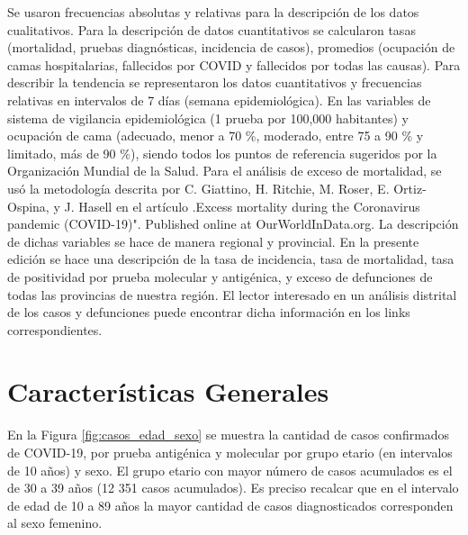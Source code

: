 \documentclass[12pt,a4paper,openany]{book}
\begin{document}
	Se usaron frecuencias absolutas y relativas para la descripción de los datos cualitativos. Para la
	descripción de datos cuantitativos se calcularon tasas (mortalidad, pruebas diagnósticas, incidencia de
	casos), promedios (ocupación de camas hospitalarias, fallecidos por COVID y fallecidos por todas las
	causas). Para describir la tendencia se representaron los datos cuantitativos y frecuencias relativas en
	intervalos de 7 días (semana epidemiológica). En las variables de sistema de vigilancia epidemiológica
		(1 prueba por 100,000 habitantes) y ocupación de cama (adecuado, menor a 70 $\%$, moderado,
	entre 75 a 90  $\%$ y limitado, más de 90 $\%$), siendo todos los puntos de referencia sugeridos por la
	Organización Mundial de la Salud. Para el análisis de exceso de mortalidad, se usó la metodología
	descrita por C. Giattino, H. Ritchie, M. Roser, E. Ortiz-Ospina, y J. Hasell en el artículo .Excess
	mortality during the Coronavirus pandemic (COVID-19)". Published online at OurWorldInData.org.
	La descripción de dichas variables se hace de manera regional y provincial. En la presente edición
	se hace una descripción de la tasa de incidencia, tasa de mortalidad, tasa de positividad por prueba
	molecular y antigénica, y exceso de defunciones de todas las provincias de nuestra región. El lector
	interesado en un análisis distrital de los casos y defunciones puede encontrar dicha información en
	los links correspondientes.
	
	
	\clearpage	
	\section*{Características Generales}
	
	
	
	\noindent En la Figura \ref{fig:casos_edad_sexo} se muestra la cantidad de casos confirmados de COVID-19, por prueba antigénica y molecular por grupo etario (en intervalos de 10 años) y sexo. El grupo etario con mayor número de casos acumulados es el de 30 a 39 años (12 351 casos acumulados). 	Es preciso recalcar que en el intervalo de edad de 10 a 89 años la mayor cantidad de casos diagnosticados corresponden al sexo femenino.  
	
\end{document}
